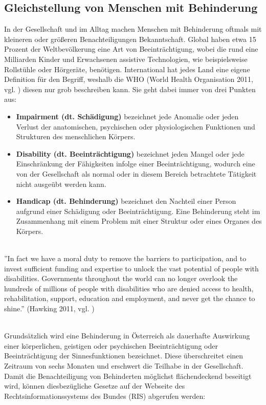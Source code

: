 \subsection{Gleichstellung von Menschen mit Behinderung}
In der Gesellschaft und im Alltag machen Menschen mit Behinderung oftmals mit kleineren oder größeren Benachteiligungen Bekanntschaft. Global haben etwa 15 Prozent der Weltbevölkerung eine Art von Beeinträchtigung, wobei die rund eine Milliarden Kinder und Erwachsenen assistive Technologien, wie beispielsweise Rollstühle oder Hörgeräte, benötigen. International hat jedes Land eine eigene Definition für den Begriff, weshalb die WHO (World Health Organisation 2011, vgl. \cite{who_disability_2011}) diesen nur grob beschreiben kann. Sie geht dabei immer von drei Punkten aus:

\begin{itemize}
    \item \textbf{Impairment (dt. Schädigung)} bezeichnet jede Anomalie oder jeden Verlust der anatomischen, psychischen oder physiologischen Funktionen und Strukturen des menschlichen Körpers.
    \item \textbf{Disability (dt. Beeinträchtigung)} bezeichnet jeden Mangel oder jede Einschränkung der Fähigkeiten infolge einer Beeinträchtigung, wodurch eine von der Gesellschaft als normal oder in diesem Bereich betrachtete Tätigkeit nicht ausgeübt werden kann.
    \item \textbf{Handicap (dt. Behinderung)} bezeichnet den Nachteil einer Person aufgrund einer Schädigung oder Beeinträchtigung. Eine Behinderung steht im Zusammenhang mit einem Problem mit einer Struktur oder eines Organes des Körpers.
\end{itemize}

\mbox{}\\
''In fact we have a moral duty to remove the barriers to participation, and to invest sufficient funding and expertise to unlock the vast potential of people with disabilities. Governments throughout
the world can no longer overlook the hundreds of millions of people with disabilities who are denied
access to health, rehabilitation, support, education and employment, and never get the chance to shine.'' (Hawking 2011, vgl. \cite{hawking_who_disability_2011})

\mbox{}\\Grundsätzlich wird eine Behinderung in Österreich als dauerhafte Auswirkung einer körperlichen, geistigen oder psychischen Beeinträchtigung oder Beeinträchtigung der Sinnesfunktionen bezeichnet. Diese überschreitet einen Zeitraum von sechs Monaten und erschwert die Teilhabe in der Gesellschaft. Damit die Benachteiligung von Behinderten möglichst flächendeckend beseitigt wird, können diesbezügliche Gesetze auf der Webseite des Rechtsinformationssystems des Bundes (RIS) abgerufen werden:

